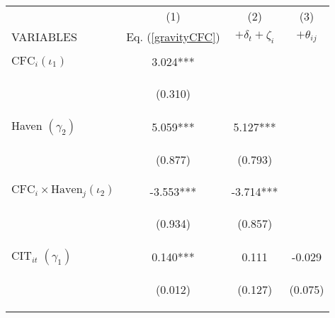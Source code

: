 \begin{center}
\begin{tabular}{lccc} \hline
 & (1) & (2) & (3) \\
VARIABLES & Eq. (\ref{gravityCFC}) & $+\delta_t+\zeta_i$ & $+\theta_{ij}$ \\ \hline
\vspace{4pt} & \begin{footnotesize}\end{footnotesize} & \begin{footnotesize}\end{footnotesize} & \begin{footnotesize}\end{footnotesize} \\
$\text{CFC}_i$$ (\iota_1)$ & 3.024*** &  &  \\
\vspace{4pt} & \begin{footnotesize}(0.310)\end{footnotesize} & \begin{footnotesize}\end{footnotesize} & \begin{footnotesize}\end{footnotesize} \\
Haven $(\gamma_2)$ & 5.059*** & 5.127*** &  \\
\vspace{4pt} & \begin{footnotesize}(0.877)\end{footnotesize} & \begin{footnotesize}(0.793)\end{footnotesize} & \begin{footnotesize}\end{footnotesize} \\
$\text{CFC}_i\times\text{Haven}_j$$ (\iota_2)$ & -3.553*** & -3.714*** &  \\
\vspace{4pt} & \begin{footnotesize}(0.934)\end{footnotesize} & \begin{footnotesize}(0.857)\end{footnotesize} & \begin{footnotesize}\end{footnotesize} \\
$ \text{CIT}_{it}$ $(\gamma_1)$ & 0.140*** & 0.111 & -0.029 \\
\vspace{4pt} & \begin{footnotesize}(0.012)\end{footnotesize} & \begin{footnotesize}(0.127)\end{footnotesize} & \begin{footnotesize}(0.075)\end{footnotesize} \\

\end{tabular}
\end{center}
